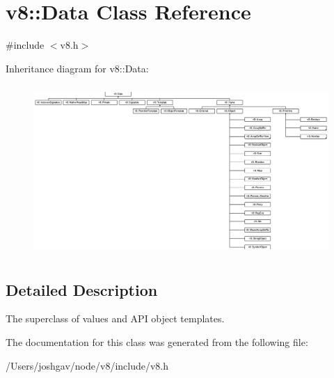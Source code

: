 \hypertarget{classv8_1_1_data}{}\section{v8\+:\+:Data Class Reference}
\label{classv8_1_1_data}


{\ttfamily \#include $<$v8.\+h$>$}

Inheritance diagram for v8\+:\+:Data\+:\begin{figure}[H]
\begin{center}
\leavevmode
\includegraphics[height=6.491763cm]{classv8_1_1_data}
\end{center}
\end{figure}


\subsection{Detailed Description}
The superclass of values and A\+PI object templates. 

The documentation for this class was generated from the following file\+:\begin{DoxyCompactItemize}
\item 
/\+Users/joshgav/node/v8/include/v8.\+h\end{DoxyCompactItemize}
